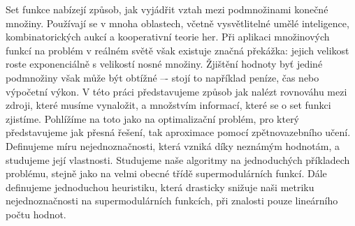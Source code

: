 \documentclass[12pt]{report}
\begin{document}
Set funkce nabízejí způsob, jak vyjádřit vztah mezi podmnožinami konečné množiny.
Používají se v mnoha oblastech, včetně vysvětlitelné umělé inteligence, kombinatorických aukcí a kooperativní teorie her.
Při aplikaci množinových funkcí na problém v reálném světě však existuje značná překážka: jejich velikost roste exponenciálně s velikostí nosné množiny.
Žjištění hodnoty byť jediné podmnožiny však může být obtížné –- stojí to například peníze, čas nebo výpočetní výkon.
V této práci představujeme způsob jak nalézt rovnováhu mezi zdroji, které musíme vynaložit, a množstvím informací, které se o set funkci zjistíme.
Pohlížíme na toto jako na optimalizační problém, pro který představujeme jak přesná řešení, tak aproximace pomocí zpětnovazebního učení.
Definujeme míru nejednoznačnosti, která vzniká díky neznámým hodnotám, a studujeme její vlastnosti.
Studujeme naše algoritmy na jednoduchých příkladech problému, stejně jako na velmi obecné třídě supermodulárních funkcí.
Dále definujeme jednoduchou heuristiku, která drasticky snižuje naši metriku nejednoznačnosti na supermodulárních funkcích, při znalosti pouze lineárního počtu hodnot.
\end{document}
